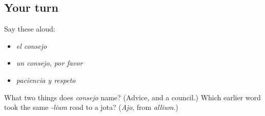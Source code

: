 \subsection*{Your turn}
Say these aloud:

\begin{itemize}
\raggedright
  \item \emph{el consejo}
  \item \emph{un consejo, por favor}
  \item \emph{paciencia y respeto}
\end{itemize}

\begin{tcolorbox}[breakable,colback=teal!4,colframe=teal!35!black,title={Before you move on}]
What two things does \emph{consejo} name? (Advice, and a council.) Which earlier word took the same \emph{-lium} road to a jota? (\emph{Ajo}, from \emph{allium}.)
\end{tcolorbox}
